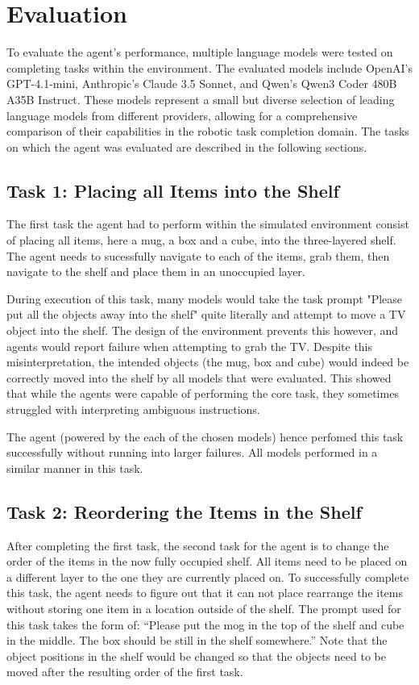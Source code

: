\documentclass[../report.tex]{subfiles}
\begin{document}
\section{Evaluation}
\label{sec:evaluation}
To evaluate the agent's performance, multiple language models were tested on completing tasks within the environment. The evaluated models include OpenAI's GPT-4.1-mini, Anthropic's Claude 3.5 Sonnet, and Qwen's Qwen3 Coder 480B A35B Instruct. These models represent a small but diverse selection of leading language models from different providers, allowing for a comprehensive comparison of their capabilities in the robotic task completion domain. The tasks on which the agent was evaluated are described in the following sections.

\subsection{Task 1: Placing all Items into the Shelf}
The first task the agent had to perform within the simulated environment consist of placing all items, here a mug, a box and a cube, into the three-layered shelf. The agent needs to sucessfully navigate to each of the items, grab them, then navigate to the shelf and place them in an unoccupied layer.

During execution of this task, many models would take the task prompt "Please put all the objects away into the shelf" quite literally and attempt to move a TV object into the shelf. The design of the environment prevents this however, and agents would report failure when attempting to grab the TV. Despite this misinterpretation, the intended objects (the mug, box and cube) would indeed be correctly moved into the shelf by all models that were evaluated. This showed that while the agents were capable of performing the core task, they sometimes struggled with interpreting ambiguous instructions.

The agent (powered by the each of the chosen models) hence perfomed this task successfully without running into larger failures. All models performed in a similar manner in this task.

\subsection{Task 2: Reordering the Items in the Shelf}
After completing the first task, the second task for the agent is to change the order of the items in the now fully occupied shelf. All items need to be placed on a different layer to the one they are currently placed on. To successfully complete this task, the agent needs to figure out that it can not place rearrange the items without storing one item in a location outside of the shelf. The prompt used for this task takes the form of: ``Please put the mog in the top of the shelf and cube in the middle. The box should be still in the shelf somewhere.'' Note that the object positions in the shelf would be changed so that the objects need to be moved after the resulting order of the first task.
\end{document}
